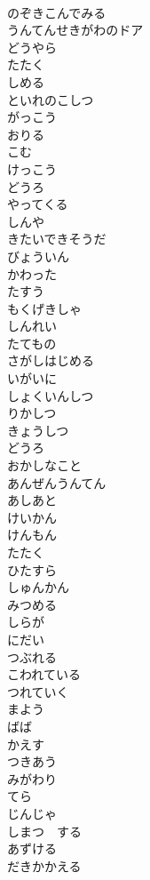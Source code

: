 \documentclass[8pt]{extreport}
\begin{document}
\begin{CJK}{UTF8}{min}
\\	のぞきこんでみる
\\	うんてんせきがわのドア
\\	どうやら
\\	たたく
\\	しめる
\\	といれのこしつ
\\	がっこう
\\	おりる
\\	こむ
\\	けっこう
\\	どうろ
\\	やってくる
\\	しんや
\\	きたいできそうだ
\\	びょういん
\\	かわった
\\	たすう
\\	もくげきしゃ
\\	しんれい
\\	たてもの
\\	さがしはじめる
\\	いがいに
\\	しょくいんしつ
\\	りかしつ
\\	きょうしつ
\\	どうろ
\\	おかしなこと
\\	あんぜんうんてん
\\	あしあと
\\	けいかん
\\	けんもん
\\	たたく
\\	ひたすら
\\	しゅんかん
\\	みつめる
\\	しらが
\\	にだい
\\	つぶれる
\\	こわれている
\\	つれていく
\\	まよう
\\	ばば
\\	かえす
\\	つきあう
\\	みがわり
\\	てら
\\	じんじゃ
\\	しまつ　する
\\	あずける
\\	だきかかえる

\end{CJK}
\end{document}
